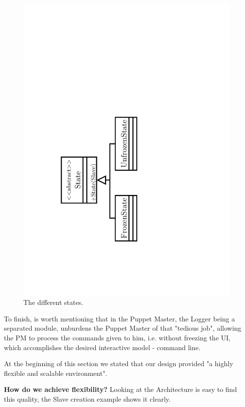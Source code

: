 \documentclass[times, 10pt,twocolumn]{article}
\begin{document}
\begin{figure}[h]
	\centering
	\includegraphics[angle=0, scale=0.45]{"Architecture/State"}
	\caption{The different states.} 
	\label{fig:state}
\end{figure}


To finish, is worth mentioning that in the Puppet Master, the Logger being a separated module, unburdens the Puppet Master of that "tedious job", allowing the PM to process the commands given to him, i.e. without freezing the UI, which accomplishes the desired interactive model - command line.


At the beginning of this section we stated that our design provided "a highly flexible and scalable environment".

\textbf{How do we achieve flexibility?} Looking at the Architecture is easy to find this quality, the Slave creation example shows it clearly.
\end{document}
